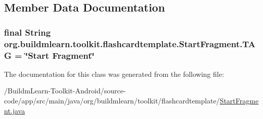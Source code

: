 \subsection{Member Data Documentation}
\hypertarget{classorg_1_1buildmlearn_1_1toolkit_1_1flashcardtemplate_1_1StartFragment_a094d9a57c85444f4c6a2116958b473ed}{
\subsubsection[{T\-A\-G}]{\setlength{\rightskip}{0pt plus 5cm}final String org.\-buildmlearn.\-toolkit.\-flashcardtemplate.\-Start\-Fragment.\-T\-A\-G = \char`\"{}Start Fragment\char`\"{}\hspace{0.3cm}{\ttfamily [static]}}}\label{classorg_1_1buildmlearn_1_1toolkit_1_1flashcardtemplate_1_1StartFragment_a094d9a57c85444f4c6a2116958b473ed}


The documentation for this class was generated from the following file\-:\begin{DoxyCompactItemize}
\item 
/\-Buildm\-Learn-\/\-Toolkit-\/\-Android/source-\/code/app/src/main/java/org/buildmlearn/toolkit/flashcardtemplate/\hyperlink{StartFragment_8java}{Start\-Fragment.\-java}\end{DoxyCompactItemize}

